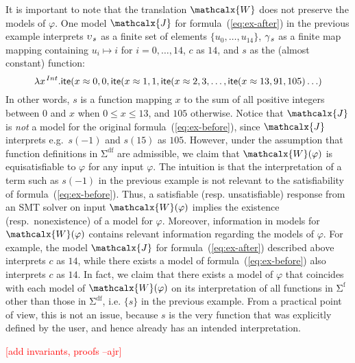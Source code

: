 \documentclass[runningheads,a4paper]{llncs}
\newcommand{\con}[1]{\mathsf{#1}}
\renewcommand\vec[1]{\overline{#1}}
\let\oldSigma=\Sigma
\def\Sigma{\mathrm{\oldSigma}}
\newcommand{\teq}{\approx}
\newcommand{\terms}{\mathcalx{T}}
\newcommand{\vars}{\mathbf{V}}
\newcommand{\M}{\mathcalx{M}}
\newcommand{\I}{\mathcalx{J}} %
\newcommand{\conv}{\mathcalx{W}}
\newcommand{\sfuns}[1]{#1^\mathrm{f}}
\newcommand{\sfundefs}[1]{#1^\mathrm{df}}
\newcommand{\lite}{\con{ite}}
\newcommand\concret{\gamma} %
\newcommand{\vecfarg}[1]{\vec{\concret}_{\vthinspace#1}}
\newcommand{\farg}[1]{\concret_{\vthinspace#1}}
\newcommand{\fargsort}[1]{\upsilon_{\vthinspace#1}}
\newcommand{\rem}[1]{\textcolor{red}{[#1]}}
\newcommand{\ajr}[1]{\rem{#1 --ajr}}
\newcommand{\vthinspace}{\kern+0.083333em}
\newcommand{\typ}[1]{^{\vthinspace #1}}
\begin{document}
It is important to note that the translation $\conv$ does not preserve the models of $\varphi$.
One model $\I$ for formula~(\ref{eq:ex-after}) in the previous example interprets 
$\fargsort{s}$ as a finite set of elements $\{ u_0, \ldots, u_{14} \}$,
$\farg{s}$ as a finite map mapping containing $u_i \mapsto i$ for $i = 0, \ldots, 14$,
$c$ as $14$, 
and $s$ as the (almost constant) function:
\begin{equation} \label{eq:approx-interp}
\lambda x\typ{Int}. \lite( x \teq 0, 0, \lite( x \teq 1, 1, \lite( x \teq 2, 3, \ldots, \lite( x \teq 13, 91, 105 ) \ldots )
\end{equation}
In other words, $s$ is a function mapping $x$ to the sum of all positive integers between $0$ and $x$ when $0 \leq x \leq 13$,
and $105$ otherwise.
Notice that $\I$ is \emph{not} a model for the original formula~(\ref{eq:ex-before}),
since $\I$ interprets e.g.\ $s( -1 )$ and $s( 15 )$ as $105$.
However, under the assumption that function definitions in $\sfundefs{\Sigma}$ are admissible, 
we claim that $\conv(\varphi)$ is equisatisfiable to $\varphi$ for any input $\varphi$.
The intuition is that the interpretation of a term such as $s( -1 )$ in the previous example is not relevant to the satisfiability of formula~(\ref{eq:ex-before}).
Thus, a satisfiable (resp. unsatisfiable) response from an SMT solver on input $\conv( \varphi )$ implies the existence (resp.\ nonexistence) of a model for $\varphi$.
Moreover, information in models for $\conv( \varphi )$ contains relevant information regarding the models of $\varphi$.
For example, the model $\I$ for formula~(\ref{eq:ex-after}) described above interprets $c$ as $14$, 
while there exists a model of formula~(\ref{eq:ex-before}) also interprets $c$ as $14$.
In fact, we claim that there exists a model of $\varphi$ that coincides with each model of $\conv( \varphi )$ on its interpretation of all functions in $\sfuns{\Sigma}$ 
other than those in $\sfundefs{\Sigma}$, i.e. $\{ s \}$ in the previous example.
From a practical point of view, this is not an issue, because
$s$ is the very function that was explicitly defined by the user,
and hence already has an intended interpretation.

\ajr{add invariants, proofs}

\end{document}
